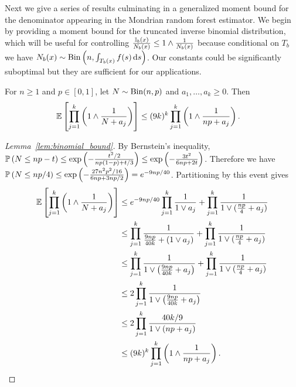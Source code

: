 Next we give a series of results culminating in a
generalized moment bound for the denominator appearing
in the Mondrian random forest estimator.
We begin by providing a moment bound for the truncated inverse binomial
distribution, which will be useful for controlling
$\frac{\I_b(x)}{N_b(x)} \leq 1 \wedge \frac{1}{N_b(x)}$
because conditional on $T_b$ we have
$N_b(x) \sim \Bin \left( n, \int_{T_b(x)} f(s) \diff s \right)$.
Our constants could be significantly suboptimal but they are sufficient
for our applications.

\begin{lemma}%
  \label{lem:binomial_bound}
  For $n \geq 1$ and $p \in [0,1]$,
  let $N \sim \Bin(n, p)$ and $a_1, \ldots, a_k \geq 0$.
  Then
  \begin{align*}
    \E\left[
      \prod_{j=1}^k
      \left(
        1 \wedge
        \frac{1}{N + a_j}
      \right)
    \right]
    &\leq
    (9k)^k
    \prod_{j=1}^k
    \left(
      1 \wedge
      \frac{1}{n p + a_j}
    \right).
  \end{align*}
\end{lemma}

\begin{proof}[Lemma~\ref{lem:binomial_bound}]
  By Bernstein's inequality,
  $\P\left( N \leq n p - t \right)
  \leq \exp\left(-\frac{t^2/2}{n p(1-p) + t/3}\right)
  \leq \exp\left(-\frac{3t^2}{6n p + 2t}\right)$.
  Therefore we have
  $\P\left( N \leq n p/4 \right)
  \leq \exp\left(-\frac{27 n^2 p^2 / 16}{6n p + 3 n p / 2}\right)
  = e^{-9 n p / 40}$.
  Partitioning by this event gives
  \begin{align*}
    \E\left[
      \prod_{j=1}^k
      \left(
        1 \wedge
        \frac{1}{N + a_j}
      \right)
    \right]
    &\leq
    e^{-9 n p / 40}
    \prod_{j=1}^k
    \frac{1}{1 \vee a_j}
    + \prod_{j=1}^k
    \frac{1}{1 \vee (\frac{n p}{4} + a_j)} \\
    &\leq
    \prod_{j=1}^k
    \frac{1}{\frac{9 n p}{40k} + (1 \vee a_j)}
    + \prod_{j=1}^k
    \frac{1}{1 \vee (\frac{n p}{4} + a_j)} \\
    &\leq
    \prod_{j=1}^k
    \frac{1}{1 \vee \left(\frac{9 n p}{40k} + a_j\right)}
    + \prod_{j=1}^k
    \frac{1}{1 \vee (\frac{n p}{4} + a_j)} \\
    &\leq
    2 \prod_{j=1}^k
    \frac{1}{1 \vee \left(\frac{9 n p}{40k} + a_j\right)} \\
    &\leq
    2 \prod_{j=1}^k
    \frac{40k/9}{1 \vee \left(n p + a_j\right)} \\
    &\leq
    (9k)^k
    \prod_{j=1}^k
    \left(
      1 \wedge
      \frac{1}{n p + a_j}
    \right).
  \end{align*}
\end{proof}

